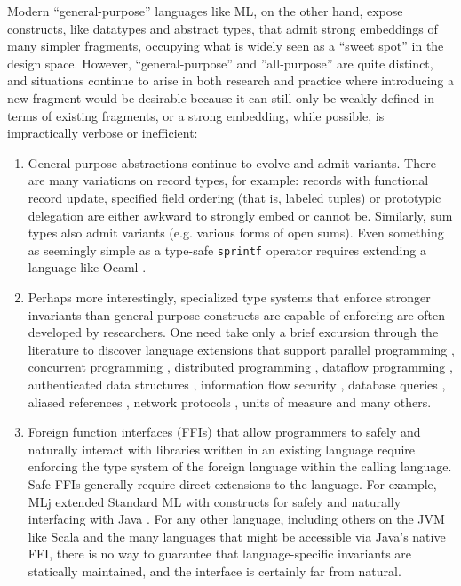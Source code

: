 \documentclass[9pt,preprint]{sigplanconf}
\begin{document}
Modern ``general-purpose'' languages like ML, on the other hand, expose constructs, like datatypes and abstract types, that admit strong embeddings of many simpler fragments, occupying what is widely seen as a ``sweet spot'' in the design space. However, ``general-purpose'' and ''all-purpose'' are quite distinct, and situations continue to arise in both research and practice where introducing a new fragment would be desirable because it can still only be weakly defined in terms of existing fragments, or a strong embedding, while possible, is impractically verbose or inefficient:
\begin{enumerate}
\item General-purpose abstractions continue to evolve and admit variants. There are many  variations on record types, for example: records with functional record update, specified field ordering (that is, labeled tuples) or prototypic delegation are either awkward to strongly embed or cannot be. Similarly, sum types also admit variants (e.g. various forms of open sums). Even something as seemingly simple as a type-safe \verb|sprintf| operator requires extending a language like Ocaml  \cite{ocaml-printf}.

\item Perhaps more interestingly, specialized type systems that enforce stronger invariants than general-purpose constructs are capable of enforcing are often developed by researchers. One need take only a brief  excursion through the literature to discover language extensions that support parallel programming \cite{a}, concurrent programming \cite{cml}, distributed programming \cite{tom7}, dataflow programming \cite{reactiveml}, authenticated data structures \cite{popl13}, information flow security \cite{walker00, smith2001}, database queries \cite{db}, aliased references \cite{naden12}, network protocols \cite{sekar99}, units of measure \cite{keneddy} and many others.%
\item Foreign function interfaces (FFIs) that allow programmers to safely and naturally interact with libraries written in an existing language require enforcing the type system of the foreign language within the calling language. %
Safe FFIs generally require direct extensions to the language. For example, MLj extended Standard ML with constructs for safely and naturally interfacing with Java \cite{mlj}. For any other language, including  others on the JVM like Scala and the many languages that might be accessible via Java's native FFI, there is no way to guarantee that language-specific invariants are statically maintained, and the interface is certainly far from natural.
\end{enumerate}
\end{document}
